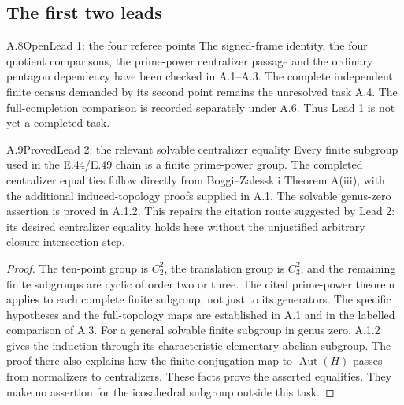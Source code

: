 \subsection{The first two leads}

\begin{result}{A.8}{Open}{Lead 1: the four referee points}
The signed-frame identity, the four quotient comparisons,
the prime-power centralizer passage and the ordinary
pentagon dependency have been checked in A.1--A.3.
The complete independent finite census demanded by its
second point remains the unresolved task A.4.
The full-completion comparison is recorded separately
under A.6. Thus Lead 1 is not yet a completed task.
\end{result}

\begin{result}{A.9}{Proved}{Lead 2: the relevant solvable centralizer equality}
Every finite subgroup used in the E.44/E.49 chain is
a finite prime-power group. The completed centralizer
equalities follow directly from Boggi--Zalesskii
Theorem A(iii), with the additional induced-topology
proofs supplied in A.1. The solvable genus-zero
assertion is proved in A.1.2. This repairs the
citation route suggested by Lead 2: its desired
centralizer equality holds here without the
unjustified arbitrary closure-intersection step.
\end{result}
\begin{proof}
The ten-point group is $C_2^2$, the translation group
is $C_3^2$, and the remaining finite subgroups are
cyclic of order two or three. The cited prime-power
theorem applies to each complete finite subgroup,
not just to its generators. The specific hypotheses
and the full-topology maps are established in A.1
and in the labelled comparison of A.3. For a
general solvable finite subgroup in genus zero,
A.1.2 gives the induction through its characteristic
elementary-abelian subgroup. The proof there also
explains how the finite conjugation map to
$\operatorname{Aut}(H)$ passes from normalizers
to centralizers. These facts prove the asserted
equalities. They make no assertion for the
icosahedral subgroup outside this task.
\end{proof}
